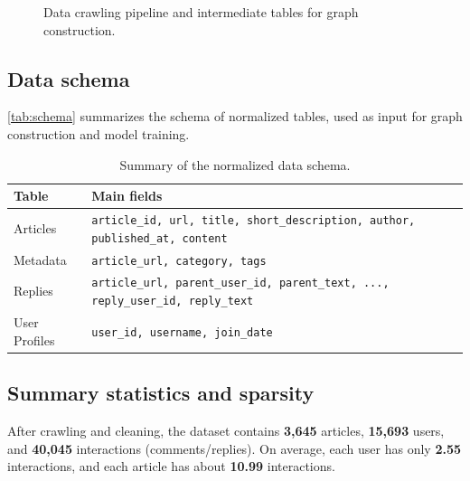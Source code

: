 \documentclass[11pt]{article}
\begin{document}
\begin{figure}[t]
    \caption{Data crawling pipeline and intermediate tables for graph construction.}
    \label{fig:crawler-pipeline}
\end{figure}

\subsection{Data schema}
\autoref{tab:schema} summarizes the schema of normalized tables,
used as input for graph construction and model training.

\begin{table}[t]
    \centering
    \small
    \setlength{\tabcolsep}{4pt}
    \begin{tabular}{l p{5.6cm}}
        \toprule
        \textbf{Table} & \textbf{Main fields}                                                                     \\
        \midrule
        Articles       & \texttt{article\_id, url, title, short\_description, author, published\_at, content}     \\
        Metadata       & \texttt{article\_url, category, tags}                                                    \\
        Replies        & \texttt{article\_url, parent\_user\_id, parent\_text, ..., reply\_user\_id, reply\_text} \\
        User Profiles  & \texttt{user\_id, username, join\_date}                                                  \\
        \bottomrule
    \end{tabular}
    \caption{Summary of the normalized data schema.}
    \label{tab:schema}
\end{table}

\subsection{Summary statistics and sparsity}
After crawling and cleaning, the dataset contains \textbf{3,645} articles, \textbf{15,693} users, and \textbf{40,045} interactions (comments/replies).
On average, each user has only \textbf{2.55} interactions, and each article has about \textbf{10.99} interactions.
\end{document}
